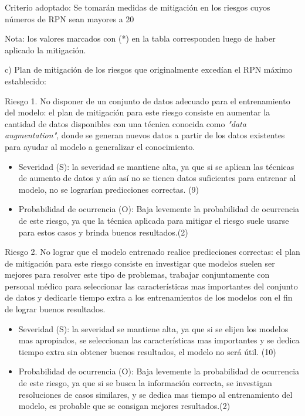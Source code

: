 \documentclass[
11pt, %
]{charter}
\begin{document}
Criterio adoptado: 
Se tomarán medidas de mitigación en los riesgos cuyos números de RPN sean mayores a 20

Nota: los valores marcados con (*) en la tabla corresponden luego de haber aplicado la mitigación.

c) Plan de mitigación de los riesgos que originalmente excedían el RPN máximo establecido:

Riesgo 1. No disponer de un conjunto de datos adecuado para el entrenamiento del modelo: el plan de mitigación para este riesgo consiste en aumentar la cantidad de datos disponibles con una técnica conocida como \textit{"data augmentation"}, donde se generan nuevos datos a partir de los datos existentes para ayudar al modelo a generalizar el conocimiento.
\begin{itemize}
	\item Severidad (S): la severidad se mantiene alta, ya que si se aplican las técnicas de aumento de datos y aún así no se tienen datos suficientes para entrenar al modelo, no se lograrían predicciones correctas. (9)
	\item Probabilidad de ocurrencia (O): Baja levemente la probabilidad de ocurrencia de este riesgo, ya que la técnica aplicada para mitigar el riesgo suele usarse para estos casos y brinda buenos resultados.(2)
\end{itemize}

Riesgo 2. No lograr que el modelo entrenado realice predicciones correctas: el plan de mitigación para este riesgo consiste en investigar que modelos suelen ser mejores para resolver este tipo de problemas, trabajar conjuntamente con personal médico para seleccionar las características mas importantes del conjunto de datos y dedicarle tiempo extra a los entrenamientos de los modelos con el fin de lograr buenos resultados.
\begin{itemize}
	\item Severidad (S): la severidad se mantiene alta, ya que si se elijen los modelos mas apropiados, se seleccionan las características mas importantes y se dedica tiempo extra sin obtener buenos resultados, el modelo no será útil. (10)
	\item Probabilidad de ocurrencia (O): Baja levemente la probabilidad de ocurrencia de este riesgo, ya que si se busca la información correcta, se investigan resoluciones de casos similares, y se dedica mas tiempo al entrenamiento del modelo, es probable que se consigan mejores resultados.(2)
\end{itemize}
\end{document}
